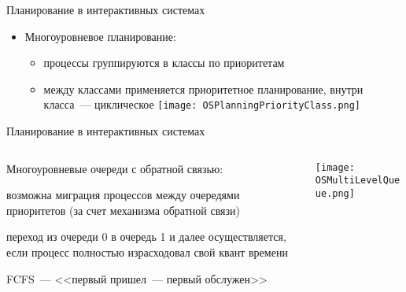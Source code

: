 \documentclass[aspectratio=169,14pt]{beamer}
\begin{document}
\begin{frame}{Планирование в интерактивных системах}
    \begin{itemize}
        \item Многоуровневое планирование:
        \begin{itemize}
            \item процессы группируются в классы по приоритетам
            \item между классами применяется приоритетное планирование,
            внутри класса~--- циклическое
            \texttt{[image: OSPlanningPriorityClass.png]}
        \end{itemize}
    \end{itemize}
\end{frame}

\begin{frame}{Планирование в интерактивных системах}
    \begin{columns}
        \begin{column}{0.5\textwidth}
            Многоуровневые очереди с обратной связью:
            \begin{itemize}
                \begin{footnotesize}
                \begin{spacing}{1.0}
                \item возможна миграция процессов между очередями приоритетов
                (за счет механизма обратной связи)
                \item переход из очереди 0 в очередь 1 и далее осуществляется,
                если процесс полностью израсходовал свой квант времени
                \item FCFS~--- <<первый пришел~--- первый обслужен>>
                \end{spacing}
                \end{footnotesize}
            \end{itemize}
        \end{column}
        \begin{column}{0.5\textwidth}
            \texttt{[image: OSMultiLevelQueue.png]}
        \end{column}
    \end{columns}
\end{frame}
\end{document}
